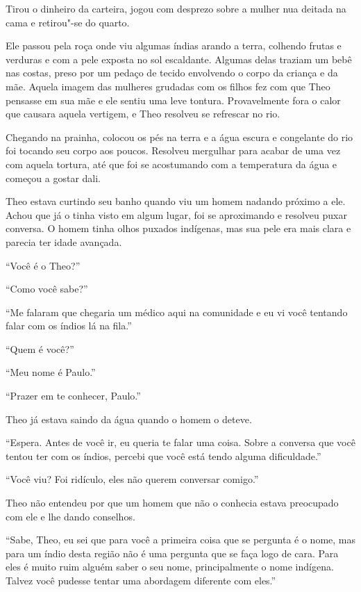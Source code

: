 Tirou o dinheiro da carteira, jogou com desprezo sobre a mulher nua
deitada na cama e retirou"-se do quarto.

\asterisc


Ele passou pela roça onde viu algumas índias arando a terra, colhendo
frutas e verduras e com a pele exposta no sol escaldante. Algumas delas
traziam um bebê nas costas, preso por um pedaço de tecido envolvendo o
corpo da criança e da mãe. Aquela imagem das mulheres grudadas com os
filhos fez com que Theo pensasse em sua mãe e ele sentiu uma leve
tontura. Provavelmente fora o calor que causara aquela vertigem, e
Theo resolveu se refrescar no rio.

Chegando na prainha, colocou os pés na terra e a água escura e
congelante do rio foi tocando seu corpo aos poucos. Resolveu mergulhar
para acabar de uma vez com aquela tortura, até que foi se acostumando
com a temperatura da água e começou a gostar dali.

Theo estava curtindo seu banho quando viu um homem nadando próximo
a ele. Achou que já o tinha visto em algum lugar, foi se aproximando e
resolveu puxar conversa. O homem tinha olhos puxados indígenas, mas sua
pele era mais clara e parecia ter idade avançada.

``Você é o Theo?''

``Como você sabe?''

``Me falaram que chegaria um médico aqui na comunidade e eu vi você
tentando falar com os índios lá na fila.''

``Quem é você?''

``Meu nome é Paulo.''

``Prazer em te conhecer, Paulo.''

Theo já estava saindo da água quando o homem o deteve.

``Espera. Antes de você ir, eu queria te falar uma coisa. Sobre a
conversa que você tentou ter com os índios, percebi que você está tendo
alguma dificuldade.''

``Você viu? Foi ridículo, eles não querem conversar comigo.''

Theo não entendeu por que um homem que não o conhecia estava preocupado
com ele e lhe dando conselhos.

``Sabe, Theo, eu sei que para você a primeira coisa que se pergunta é o
nome, mas para um índio desta região não é uma pergunta que se faça logo
de cara. Para eles é muito ruim alguém saber o seu nome, principalmente
o nome indígena. Talvez você pudesse tentar uma abordagem diferente com
eles.''

